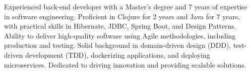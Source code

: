 \vspace*{-12pt}
\begin{referees}
\par{
    \vspace*{4pt}
    Experienced back-end developer with a Master's degree and 7 years of expertise in software engineering. Proficient in Clojure for 2 years and Java for 7 years, with practical skills in Hibernate, JDBC, Spring Boot, and Design Patterns. Ability to deliver high-quality software using Agile methodologies, including production and testing. Solid background in domain-driven design (DDD), test-driven development (TDD), dockerizing applications, and deploying microservices. Dedicated to driving innovation and providing scalable solutions.}
\end{referees}